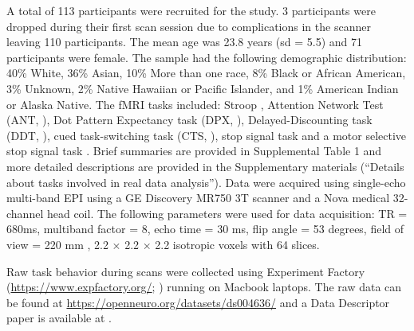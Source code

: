 \documentclass[sn-mathphys,Numbered, super, referee, lineno]{sn-jnl}
\begin{document}
A total of 113 participants were recruited for the study. 3 participants were dropped during their first scan session due to complications in the scanner leaving 110 participants.  The mean age was 23.8 years (sd = 5.5) and 71 participants were female.  The sample had the following demographic distribution: 40\% White, 36\% Asian, 10\% More than one race, 8\% Black or African American, 3\% Unknown, 2\% Native Hawaiian or Pacific Islander, and 1\% American Indian or Alaska Native. The fMRI tasks included: Stroop \citep{stroop_1935}, Attention Network Test (ANT, \citet{fanTestingEfficiencyIndependence2002}), Dot Pattern Expectancy task (DPX, \citet{macdonald2005}), Delayed-Discounting task (DDT, \citet{kirby2009}), cued task-switching task (CTS, \citet{logan2003}), stop signal task \citep{logan1984} and a motor selective stop signal task \citep{dejong1995}.  Brief summaries are provided in  Supplemental Table 1 and more detailed descriptions are provided in the Supplementary materials (``Details about tasks involved in real data analysis'').  Data were acquired using single-echo multi-band EPI using a GE Discovery MR750 3T scanner and a Nova medical 32-channel head coil. The following parameters were used for data acquisition: TR = 680ms, multiband factor = 8, echo time = 30 ms, flip angle = 53 degrees, field of view = 220 mm , 2.2 $\times$ 2.2 $\times$ 2.2 isotropic voxels with 64 slices.

Raw task behavior during scans were collected using Experiment Factory (\url{https://www.expfactory.org/}; \cite{sochat_2016}) running on Macbook laptops.  The raw data can be found at \url{ https://openneuro.org/datasets/ds004636/} and a Data Descriptor paper is available at \citet{dd_preprint}.
\end{document}
